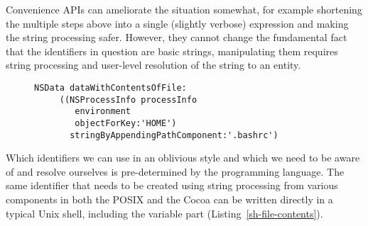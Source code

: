 \documentclass[preprint,authoryear]{acm_proc_article-sp}
\begin{document}
Convenience APIs can ameliorate the situation somewhat, for example shortening 
the multiple steps above into a single (slightly verbose) expression and making the
string processing safer.  However, they cannot
change the fundamental fact that the identifiers in question are basic strings,
manipulating them requires string processing and user-level resolution of the
string to an entity.

%

\begin{figure}[htbp]
\begin{lstlisting}[style=L,label=cocoa-file-contents,caption=Cocoa convenience API for accessing file contents.]
   NSData dataWithContentsOfFile:
     ((NSProcessInfo processInfo
        environment 
        objectForKey:'HOME') 
       stringByAppendingPathComponent:'.bashrc')
\end{lstlisting}
\end{figure}

Which identifiers we can use in an oblivious style and which we need to
be aware of and resolve ourselves is pre-determined by the programming
language.
The same identifier that needs to be created using string processing from various
components in both the POSIX and the Cocoa can be written directly in a typical
Unix shell, including the variable part (Listing~\ref{sh-file-contents}).

\end{document}
